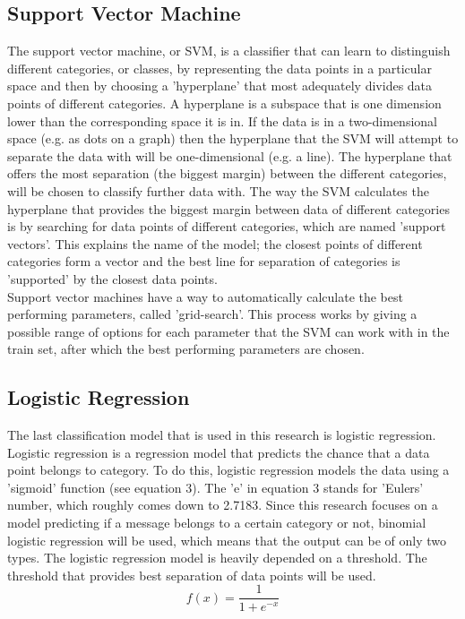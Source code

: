 \documentclass[
10pt, %
a4paper, %
oneside, %
headinclude,footinclude, %
] {book}%
\begin{document}
\subsection{Support Vector Machine}
The support vector machine, or SVM, is a classifier that can learn to distinguish different categories, or classes, by representing the data points in a particular space and then by choosing a 'hyperplane' that most adequately divides data points of different categories. A hyperplane is a subspace that is one dimension lower than the corresponding space it is in. If the data is in a two-dimensional space (e.g. as dots on a graph) then the hyperplane that the SVM will attempt to separate the data with will be one-dimensional (e.g. a line). The hyperplane that offers the most separation (the biggest margin) between the different categories, will be chosen to classify further data with. 
The way the SVM calculates the hyperplane that provides the biggest margin between data of different categories is by searching for data points of different categories, which are named 'support vectors'. This explains the name of the model; the closest points of different categories form a vector and the best line for separation of categories is 'supported' by the closest data points. \\

Support vector machines have a way to automatically calculate the best performing parameters, called 'grid-search'. This process works by giving a possible range of options for each parameter that the SVM can work with in the train set, after which the best performing parameters are chosen. 

\subsection{Logistic Regression}
The last classification model that is used in this research is logistic regression. Logistic regression is a regression model that predicts the chance that a data point belongs to category. To do this, logistic regression models the data using a 'sigmoid' function (see equation 3). The 'e' in equation 3 stands for 'Eulers' number, which roughly comes down to 2.7183. Since this research focuses on a model predicting if a message belongs to a certain category or not, binomial logistic regression will be used, which means that the output can be of only two types. The logistic regression model is heavily depended on a threshold. The threshold that provides best separation of data points will be used.
\begin{equation}
f(x)=\frac{1}{1+e^{-x}}
\end{equation}
\end{document}
